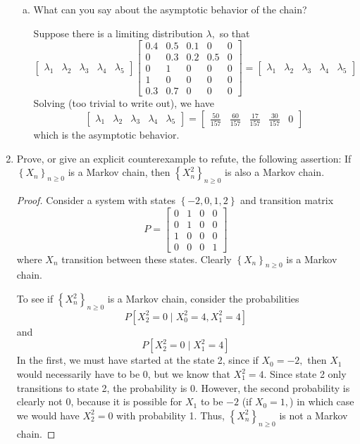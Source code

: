 \documentclass{article}
\begin{document}
\begin{enumerate}
\begin{enumerate}[(a)]
			\item What can you say about the asymptotic behavior of the chain?
				\begin{soln}
					Suppose there is a limiting distribution $\lambda,$ so that
					\[\begin{bmatrix}
							\lambda_1 & \lambda_2 & \lambda_3 & \lambda_4 & \lambda_5
						\end{bmatrix} \begin{bmatrix}
							0.4 & 0.5 & 0.1 & 0 & 0 \\
							0 & 0.3 & 0.2 & 0.5 & 0 \\
							0 & 1 & 0 & 0 & 0 \\
							1 & 0 & 0 & 0 & 0 \\
							0.3 & 0.7 & 0 & 0 & 0
						\end{bmatrix} = \begin{bmatrix}
							\lambda_1 & \lambda_2 & \lambda_3 & \lambda_4 & \lambda_5
					\end{bmatrix}\]
					Solving (too trivial to write out), we have 
					\[\begin{bmatrix}
							\lambda_1 & \lambda_2 & \lambda_3 & \lambda_4 & \lambda_5
						\end{bmatrix} = \begin{bmatrix}
							\frac{50}{157} & \frac{60}{157} & \frac{17}{157} & \frac{30}{157} & 0
					\end{bmatrix}\]
					which is the asymptotic behavior.
				\end{soln}

		\end{enumerate}

	\item Prove, or give an explicit counterexample to refute, the following assertion: If $\left\{ X_n \right\}_{n\ge0}$ is a Markov chain, then $\left\{ X_n^2 \right\}_{n\ge0}$ is also a Markov chain.
		\begin{proof}
			Consider a system with states $\left\{ -2, 0, 1, 2 \right\}$ and transition matrix
			\[P=\begin{bmatrix}
					0 & 1 & 0 & 0 \\
					0 & 1 & 0 & 0 \\
					1 & 0 & 0 & 0 \\
					0 & 0 & 0 & 1
			\end{bmatrix}\]
			where $X_n$ transition between these states. Clearly $\left\{ X_n \right\}_{n\ge0}$ is a Markov chain. 

			To see if $\left\{X_n^2\right\}_{n\ge0}$ is a Markov chain, consider the probabilities
			\[P[X_2^2=0\mid X_0^2=4, X_1^2=4]\]
			and
			\[P[X_2^2=0\mid X_1^2=4]\]
			In the first, we must have started at the state 2, since if $X_0=-2,$ then $X_1$ would necessarily have to be 0, but we know that $X_1^2=4.$ Since state 2 only transitions to state 2, the probability is 0. However, the second probability is clearly not 0, because it is possible for $X_1$ to be $-2$ (if $X_0=1,$) in which case we would have $X_2^2=0$ with probability 1. Thus, $\left\{ X_n^2 \right\}_{n\ge0}$ is not a Markov chain.
		\end{proof}


\end{enumerate}
\end{document}
